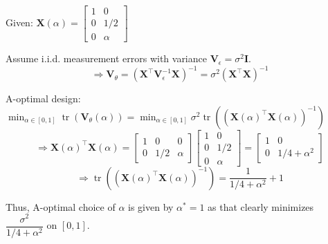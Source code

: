 \begin{solution}
    Given: \(\displaystyle \mathbf{X}(\alpha) = \begin{bmatrix}
        1 & 0\\ 0 & 1/2\\ 0 & \alpha
    \end{bmatrix}\)
    
    Assume i.i.d. measurement errors with variance \(\mathbf{V}_{\epsilon} = \sigma^2\mathbf{I}\). 
    \[
        \Rightarrow \mathbf{V}_{\theta} = \left(\mathbf{X}^\top\mathbf{V}_{\epsilon}^{-1}\mathbf{X}\right)^{-1} = \sigma^2\left(\mathbf{X}^\top\mathbf{X}\right)^{-1}
    \]

    A-optimal design: \(\displaystyle \min_{\alpha\in[0,1]} \operatorname{tr}(\mathbf{V}_{\theta}(\alpha)) = \min_{\alpha\in[0,1]} \sigma^2 \operatorname{tr}\left((\mathbf{X}(\alpha)^\top\mathbf{X}(\alpha))^{-1}\right)\)
    \[
        \Rightarrow \mathbf{X}(\alpha)^\top \mathbf{X}(\alpha) = \begin{bmatrix}
            1 & 0 & 0\\
            0 & 1/2 & \alpha
        \end{bmatrix}
        \begin{bmatrix}
            1 & 0\\
            0 & 1/2\\
            0 & \alpha
        \end{bmatrix}
        = \begin{bmatrix}
            1 & 0\\
            0 & 1/4 + \alpha^2
        \end{bmatrix}
    \]
    \[
         \Rightarrow \operatorname{tr}\left((\mathbf{X}(\alpha)^\top\mathbf{X}(\alpha))^{-1}\right) = \frac{1}{1/4 + \alpha^2} + 1
    \]

    Thus, A-optimal choice of \(\alpha\) is given by \(\alpha^{*} = 1\) as that clearly minimizes \(\dfrac{\sigma^2}{1/4 + \alpha^2}\) on \([0,1]\).
\end{solution}

